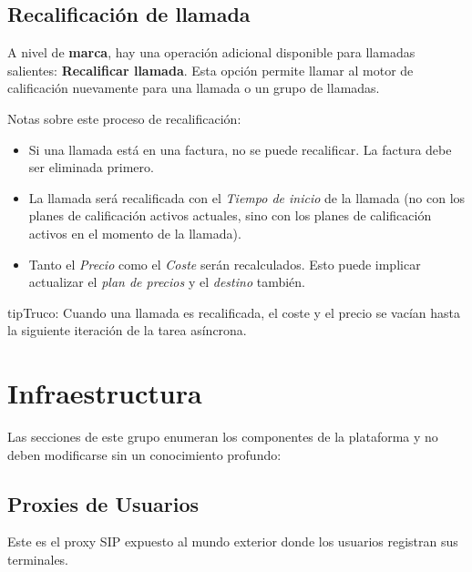 \documentclass[letterpaper,10pt,spanish]{sphinxmanual}
\begin{document}
\subsection{Recalificación de llamada}
\label{administration_portal/platform/external_calls:call-rerating}
A nivel de \textbf{marca}, hay una operación adicional disponible para llamadas salientes: \textbf{Recalificar llamada}. Esta opción permite llamar al motor de calificación nuevamente para una llamada o un grupo de llamadas.

Notas sobre este proceso de recalificación:
\begin{itemize}
\item {} 
Si una llamada está en una factura, no se puede recalificar. La factura debe ser eliminada primero.

\item {} 
La llamada será recalificada con el \emph{Tiempo de inicio} de la llamada (no con los planes de calificación activos actuales, sino con los planes de calificación activos en el momento de la llamada).

\item {} 
Tanto el \emph{Precio} como el \emph{Coste} serán recalculados. Esto puede implicar actualizar el \emph{plan de precios} y el \emph{destino} también.

\end{itemize}

\begin{notice}{tip}{Truco:}
Cuando una llamada es recalificada, el coste y el precio se vacían hasta la siguiente iteración de la tarea asíncrona.
\end{notice}


\section{Infraestructura}
\label{administration_portal/platform/infrastructure/index:infrastructure}\label{administration_portal/platform/infrastructure/index::doc}
Las secciones de este grupo enumeran los componentes de la plataforma y no deben modificarse sin un conocimiento profundo:


\subsection{Proxies de Usuarios}
\label{administration_portal/platform/infrastructure/proxy_users:proxy-users}\label{administration_portal/platform/infrastructure/proxy_users:proxyusers}\label{administration_portal/platform/infrastructure/proxy_users::doc}
Este es el proxy SIP expuesto al mundo exterior donde los usuarios registran sus terminales.
\end{document}
